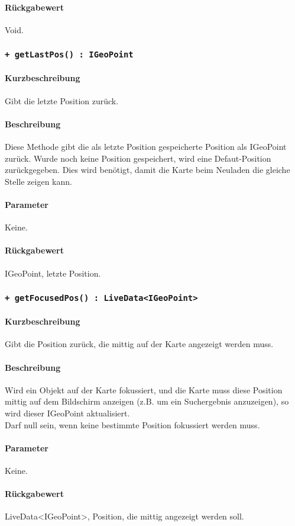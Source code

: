 \paragraph*{Rückgabewert}
Void.

\subsubsection{\texttt{+ getLastPos() : IGeoPoint}}%
\paragraph*{Kurzbeschreibung}
Gibt die letzte Position zurück.
\paragraph*{Beschreibung}
Diese Methode gibt die als letzte Position gespeicherte Position als IGeoPoint zurück.
Wurde noch keine Position gespeichert, wird eine Defaut-Position zurückgegeben.
Dies wird benötigt, damit die Karte beim Neuladen die gleiche Stelle zeigen kann.
\paragraph*{Parameter}
Keine.
\paragraph*{Rückgabewert}
IGeoPoint, letzte Position.

\subsubsection{\texttt{+ getFocusedPos() : LiveData<IGeoPoint>}}%
\paragraph*{Kurzbeschreibung}
Gibt die Position zurück, die mittig auf der Karte angezeigt werden muss.
\paragraph*{Beschreibung}
Wird ein Objekt auf der Karte fokussiert, und die Karte muss diese Position mittig auf dem 
Bildschirm anzeigen (z.B. um ein Suchergebnis anzuzeigen), so wird dieser IGeoPoint aktualisiert.\\
Darf null sein, wenn keine bestimmte Position fokussiert werden muss.
\paragraph*{Parameter}
Keine.
\paragraph*{Rückgabewert}
LiveData<IGeoPoint>, Position, die mittig angezeigt werden soll.
